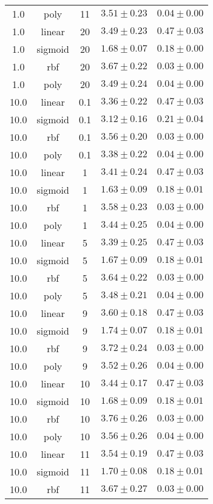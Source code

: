 \begin{tabular}{cccrr}
1.0 & poly & 11 & $3.51 \pm 0.23$ & $0.04 \pm 0.00$\\
1.0 & linear & 20 & $3.49 \pm 0.23$ & $0.47 \pm 0.03$\\
1.0 & sigmoid & 20 & $1.68 \pm 0.07$ & $0.18 \pm 0.00$\\
1.0 & rbf & 20 & $3.67 \pm 0.22$ & $0.03 \pm 0.00$\\
1.0 & poly & 20 & $3.49 \pm 0.24$ & $0.04 \pm 0.00$\\
10.0 & linear & 0.1 & $3.36 \pm 0.22$ & $0.47 \pm 0.03$\\
10.0 & sigmoid & 0.1 & $3.12 \pm 0.16$ & $0.21 \pm 0.04$\\
10.0 & rbf & 0.1 & $3.56 \pm 0.20$ & $0.03 \pm 0.00$\\
10.0 & poly & 0.1 & $3.38 \pm 0.22$ & $0.04 \pm 0.00$\\
10.0 & linear & 1 & $3.41 \pm 0.24$ & $0.47 \pm 0.03$\\
10.0 & sigmoid & 1 & $1.63 \pm 0.09$ & $0.18 \pm 0.01$\\
10.0 & rbf & 1 & $3.58 \pm 0.23$ & $0.03 \pm 0.00$\\
10.0 & poly & 1 & $3.44 \pm 0.25$ & $0.04 \pm 0.00$\\
10.0 & linear & 5 & $3.39 \pm 0.25$ & $0.47 \pm 0.03$\\
10.0 & sigmoid & 5 & $1.67 \pm 0.09$ & $0.18 \pm 0.01$\\
10.0 & rbf & 5 & $3.64 \pm 0.22$ & $0.03 \pm 0.00$\\
10.0 & poly & 5 & $3.48 \pm 0.21$ & $0.04 \pm 0.00$\\
10.0 & linear & 9 & $3.60 \pm 0.18$ & $0.47 \pm 0.03$\\
10.0 & sigmoid & 9 & $1.74 \pm 0.07$ & $0.18 \pm 0.01$\\
10.0 & rbf & 9 & $3.72 \pm 0.24$ & $0.03 \pm 0.00$\\
10.0 & poly & 9 & $3.52 \pm 0.26$ & $0.04 \pm 0.00$\\
10.0 & linear & 10 & $3.44 \pm 0.17$ & $0.47 \pm 0.03$\\
10.0 & sigmoid & 10 & $1.68 \pm 0.09$ & $0.18 \pm 0.01$\\
10.0 & rbf & 10 & $3.76 \pm 0.26$ & $0.03 \pm 0.00$\\
10.0 & poly & 10 & $3.56 \pm 0.26$ & $0.04 \pm 0.00$\\
10.0 & linear & 11 & $3.54 \pm 0.19$ & $0.47 \pm 0.03$\\
10.0 & sigmoid & 11 & $1.70 \pm 0.08$ & $0.18 \pm 0.01$\\
10.0 & rbf & 11 & $3.67 \pm 0.27$ & $0.03 \pm 0.00$\\

\end{tabular}
